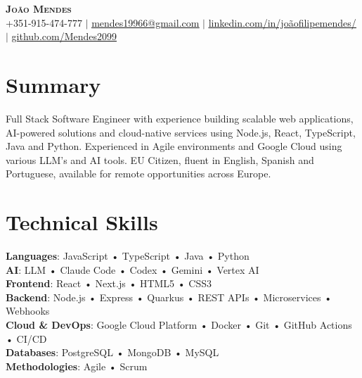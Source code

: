 \documentclass[letterpaper,11pt]{article}
\begin{document}

\begin{center}
    \textbf{\Huge \scshape João Mendes} \\ \vspace{1pt}
    \small +351-915-474-777 $|$ \href{mailto:x@x.com}{\underline{mendes19966@gmail.com}} $|$ 
    \href{https://linkedin.com/in/...}{\underline{linkedin.com/in/joãofilipemendes/}} $|$
    \href{https://github.com/...}{\underline{github.com/Mendes2099}}
\end{center}
\section{Summary}

Full Stack Software Engineer with experience building scalable web applications, AI-powered solutions and cloud-native services using Node.js, React, TypeScript, Java and Python. Experienced in Agile environments and Google Cloud using various LLM's and AI tools. EU Citizen, fluent in English, Spanish and Portuguese, available for remote opportunities across Europe.
\section{Technical Skills}
\begin{itemize}[leftmargin=0.15in, label={}]
  \small{\item{
    \textbf{Languages}: JavaScript • TypeScript • Java • Python \\
    \textbf{AI}: LLM • Claude Code • Codex • Gemini • Vertex AI \\
    \textbf{Frontend}: React • Next.js • HTML5 • CSS3 \\
    \textbf{Backend}: Node.js • Express • Quarkus • REST APIs • Microservices • Webhooks\\
    \textbf{Cloud \& DevOps}: Google Cloud Platform • Docker • Git • GitHub Actions • CI/CD \\  
    \textbf{Databases}: PostgreSQL • MongoDB • MySQL \\
    \textbf{Methodologies}: Agile • Scrum
  }}
\end{itemize}
\end{document}
